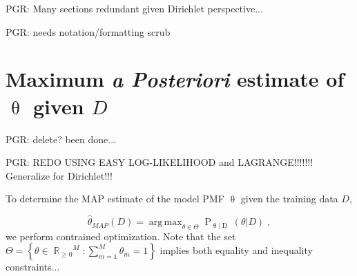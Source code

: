\documentclass[12pt]{report}
\DeclareMathOperator*{\argmax}{arg\,max}
\DeclareMathOperator{\Drm}{\mathrm{D}}
\DeclareMathOperator{\Prm}{\mathrm{P}}
\DeclareMathOperator{\Rbb}{\mathbb{R}}
\begin{document}
PGR: Many sections redundant given Dirichlet perspective...

PGR: needs notation/formatting scrub






\section{Maximum \emph{a Posteriori} estimate of $\uptheta$ given $D$} \label{app:MAP_theta}

PGR: delete? been done...

PGR: REDO USING EASY LOG-LIKELIHOOD and LAGRANGE!!!!!!! Generalize for Dirichlet!!!

To determine the MAP estimate of the model PMF $\uptheta$ given the training data $D$, 

\begin{equation}
\hat{\theta}_{MAP}(D) = \argmax_{\theta \in \Theta} \Prm_{\uptheta | \Drm}(\theta | D) \;,
\end{equation}
we perform contrained optimization. Note that the set $\Theta = \left\{ \theta \in {\Rbb_{\geq 0}}^{M}: \sum_{m=1}^{M} \theta_m = 1 \right\}$ implies both equality and inequality constraints...
\end{document}
